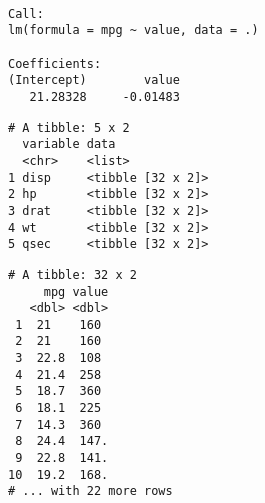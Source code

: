 \documentclass[12pt,letterpaperpaper,openany]{book}
\newenvironment{Shaded}{\begin{snugshade}}{\end{snugshade}}
\newcommand{\DataTypeTok}[1]{\textcolor[rgb]{0.13,0.29,0.53}{#1}}
\newcommand{\DecValTok}[1]{\textcolor[rgb]{0.00,0.00,0.81}{#1}}
\newcommand{\KeywordTok}[1]{\textcolor[rgb]{0.13,0.29,0.53}{\textbf{#1}}}
\newcommand{\NormalTok}[1]{#1}
\newcommand{\OperatorTok}[1]{\textcolor[rgb]{0.81,0.36,0.00}{\textbf{#1}}}
\newcommand{\StringTok}[1]{\textcolor[rgb]{0.31,0.60,0.02}{#1}}
\begin{document}
\begin{verbatim}

Call:
lm(formula = mpg ~ value, data = .)

Coefficients:
(Intercept)        value  
   21.28328     -0.01483  
\end{verbatim}

\begin{Shaded}
\end{Shaded}

\begin{verbatim}
# A tibble: 5 x 2
  variable data             
  <chr>    <list>           
1 disp     <tibble [32 x 2]>
2 hp       <tibble [32 x 2]>
3 drat     <tibble [32 x 2]>
4 wt       <tibble [32 x 2]>
5 qsec     <tibble [32 x 2]>
\end{verbatim}

\begin{Shaded}
\end{Shaded}

\begin{verbatim}
# A tibble: 32 x 2
     mpg value
   <dbl> <dbl>
 1  21    160 
 2  21    160 
 3  22.8  108 
 4  21.4  258 
 5  18.7  360 
 6  18.1  225 
 7  14.3  360 
 8  24.4  147.
 9  22.8  141.
10  19.2  168.
# ... with 22 more rows
\end{verbatim}

\begin{Shaded}
\end{Shaded}
\end{document}
